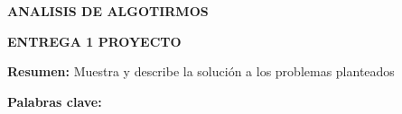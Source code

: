 \documentclass[10pt]{article}
\author{usuario}
\title{}
\begin{document}
\begin{center}
\textbf{{\huge ANALISIS DE ALGOTIRMOS}}
\end{center}

\begin{center}
\textbf{{\huge ENTREGA 1 PROYECTO}}
\end{center}

\begin{center}
\end{center}

\textbf{Resumen:} Muestra y describe la soluci\'{o}n a los problemas planteados

\textbf{Palabras clave: }
\end{document}
